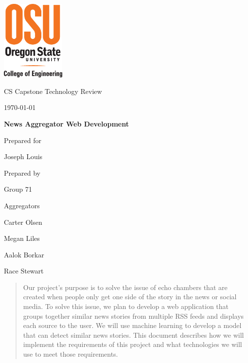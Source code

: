 \documentclass[onecolumn, draftclsnofoot,10pt, compsoc]{IEEEtran}
\def \CapstoneTeamName{Aggregators}
\def \CapstoneTeamNumber{71}
\def \GroupMemberOne{Carter Olsen}
\def \GroupMemberTwo{Megan Liles}
\def \GroupMemberThree{Aalok Borkar}
\def \GroupMemberFour{Race Stewart}
\def \CapstoneProjectName{News Aggregator Web Development}
\def \CapstoneSponsorPerson{Joseph Louis}
\def \DocType{		%
				Technology Review
				}
\begin{document}
\begin{titlepage}
    \begin{singlespace}
    	\includegraphics[height=4cm]{coe_v_spot1}
        \hfill 
        \par\vspace{.2in}
        \centering
        \scshape{
            \huge CS Capstone \DocType \par
            {\large\today}\par
            \vspace{.5in}
            \textbf{\Huge\CapstoneProjectName}\par
            \vfill
            {\large Prepared for}\par
            \vspace{5pt}
            {\Large\CapstoneSponsorPerson\par}
            {\large Prepared by }\par
            Group \CapstoneTeamNumber\par
            \CapstoneTeamName\par 
            \vspace{5pt}
            {\Large
                \GroupMemberOne\par
                \GroupMemberTwo\par
                \GroupMemberThree\par
                \GroupMemberFour\par
            }
            \vspace{20pt}
        }
        \begin{abstract}
        Our project's purpose is to solve the issue of echo chambers that are created when people only get one side of the story in the news or social media.
        To solve this issue, we plan to develop a web application that groups together similar news stories from multiple RSS feeds and displays each source to the user. We will use machine learning to develop a model that can detect similar news stories.
        This document describes how we will implement the requirements of this project and what technologies we will use to meet those requirements.
        \end{abstract}     
    \end{singlespace}
\end{titlepage}
\newpage
{}
\tableofcontents
\clearpage
\end{document}
